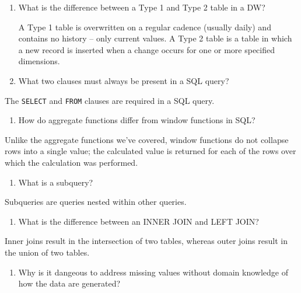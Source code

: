 \documentclass[]{book}
\providecommand{\tightlist}{%
  \setlength{\itemsep}{0pt}\setlength{\parskip}{0pt}}
\begin{document}
\begin{enumerate}
\def\labelenumi{\arabic{enumi}.}
\setcounter{enumi}{1}
\item
  What is the difference between a Type 1 and Type 2 table in a DW?

  A Type 1 table is overwritten on a regular cadence (usually daily) and contains no history -- only current values. A Type 2 table is a table in which a new record is inserted when a change occurs for one or more specified dimensions.
\item
  What two clauses must always be present in a SQL query?
\end{enumerate}

The \texttt{SELECT} and \texttt{FROM} clauses are required in a SQL query.

\begin{enumerate}
\def\labelenumi{\arabic{enumi}.}
\setcounter{enumi}{3}
\tightlist
\item
  How do aggregate functions differ from window functions in SQL?
\end{enumerate}

Unlike the aggregate functions we've covered, window functions do not collapse rows into a single value; the calculated value is returned for each of the rows over which the calculation was performed.

\begin{enumerate}
\def\labelenumi{\arabic{enumi}.}
\setcounter{enumi}{4}
\tightlist
\item
  What is a subquery?
\end{enumerate}

Subqueries are queries nested within other queries.

\begin{enumerate}
\def\labelenumi{\arabic{enumi}.}
\setcounter{enumi}{5}
\tightlist
\item
  What is the difference between an INNER JOIN and LEFT JOIN?
\end{enumerate}

Inner joins result in the intersection of two tables, whereas outer joins result in the union of two tables.

\begin{enumerate}
\def\labelenumi{\arabic{enumi}.}
\setcounter{enumi}{6}
\tightlist
\item
  Why is it dangeous to address missing values without domain knowledge of how the data are generated?
\end{enumerate}
\end{document}
